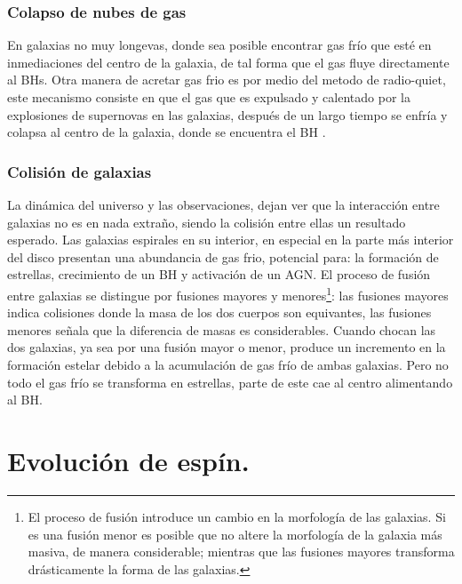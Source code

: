    \subsubsection{Colapso de nubes de gas}
    \label{subsubsec: colapso_nubes_gas}
En galaxias no muy longevas, donde sea posible encontrar gas frío que esté en inmediaciones del centro de la galaxia, de tal forma que el gas fluye directamente al BHs. Otra manera de acretar gas frio es por medio del metodo de radio-quiet, este mecanismo consiste en que el gas que es expulsado y calentado por la explosiones de supernovas en las galaxias, después de un largo tiempo se enfría y colapsa al centro de la galaxia, donde se encuentra el BH \cite{fanidakis2011}.

    \subsubsection{Colisión de galaxias}
    \label{subsubsec: mergers_galaxys}
La dinámica del universo y las observaciones, dejan ver que la interacción entre galaxias no es en nada extraño, siendo la colisión entre ellas un resultado esperado. Las galaxias espirales en su interior, en especial en la parte más interior del disco presentan una abundancia de gas frio, potencial para: la formación de estrellas, crecimiento de un BH y activación de un AGN. El proceso de fusión entre galaxias se distingue por fusiones mayores y menores\footnote{El proceso de fusión introduce un cambio en la morfología de las galaxias. Si es una fusión menor es posible que no altere la morfología de la galaxia más masiva, de manera considerable; mientras que las fusiones mayores transforma drásticamente la forma de las galaxias. }: las fusiones mayores indica colisiones donde la masa de los dos cuerpos son equivantes, las fusiones menores señala que la diferencia de masas es considerables. Cuando chocan las dos galaxias, ya sea por una fusión mayor o menor, produce un incremento en la formación estelar debido a la acumulación de gas frío de ambas galaxias. Pero no todo el gas frío se transforma en estrellas, parte de este cae al centro alimentando al BH.

\section{Evolución de espín.}
\label{sec: Evolution_spin}

